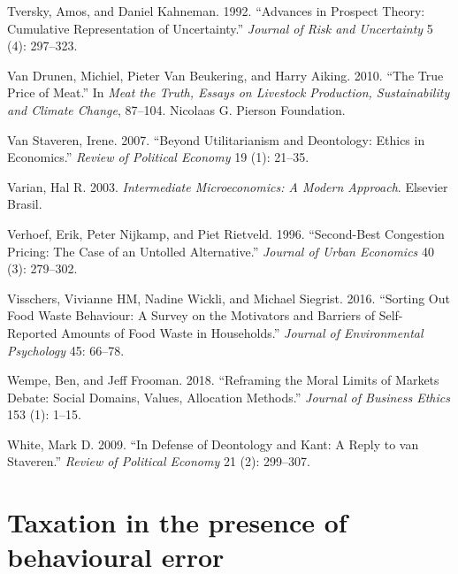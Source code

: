 \documentclass[
]{book}
\newlength{\cslhangindent}
\newlength{\cslentryspacingunit} %
\newenvironment{CSLReferences}[2] %
 {%
  \setlength{\parindent}{0pt}
  \ifodd #1
  \let\oldpar\par
  \def\par{\hangindent=\cslhangindent\oldpar}
  \fi
  \setlength{\parskip}{#2\cslentryspacingunit}
 }%
 {}
\begin{document}
\begin{CSLReferences}{1}{0}
\leavevmode{}%
Tversky, Amos, and Daniel Kahneman. 1992. {``Advances in Prospect Theory: Cumulative Representation of Uncertainty.''} \emph{Journal of Risk and Uncertainty} 5 (4): 297--323.

\leavevmode{}%
Van Drunen, Michiel, Pieter Van Beukering, and Harry Aiking. 2010. {``The True Price of Meat.''} In \emph{Meat the Truth, Essays on Livestock Production, Sustainability and Climate Change}, 87--104. Nicolaas G. Pierson Foundation.

\leavevmode{}%
Van Staveren, Irene. 2007. {``Beyond Utilitarianism and Deontology: Ethics in Economics.''} \emph{Review of Political Economy} 19 (1): 21--35.

\leavevmode{}%
Varian, Hal R. 2003. \emph{Intermediate Microeconomics: A Modern Approach}. Elsevier Brasil.

\leavevmode{}%
Verhoef, Erik, Peter Nijkamp, and Piet Rietveld. 1996. {``Second-Best Congestion Pricing: The Case of an Untolled Alternative.''} \emph{Journal of Urban Economics} 40 (3): 279--302.

\leavevmode{}%
Visschers, Vivianne HM, Nadine Wickli, and Michael Siegrist. 2016. {``Sorting Out Food Waste Behaviour: A Survey on the Motivators and Barriers of Self-Reported Amounts of Food Waste in Households.''} \emph{Journal of Environmental Psychology} 45: 66--78.

\leavevmode{}%
Wempe, Ben, and Jeff Frooman. 2018. {``Reframing the Moral Limits of Markets Debate: Social Domains, Values, Allocation Methods.''} \emph{Journal of Business Ethics} 153 (1): 1--15.

\leavevmode{}%
White, Mark D. 2009. {``In Defense of Deontology and Kant: A Reply to van Staveren.''} \emph{Review of Political Economy} 21 (2): 299--307.

\end{CSLReferences}

\hypertarget{appendix-appendix}{%
\appendix}


\hypertarget{apperror}{%
\chapter{Taxation in the presence of behavioural error}\label{apperror}}
\end{document}
